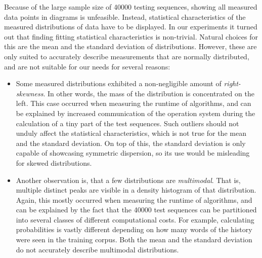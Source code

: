 Because of the large sample size of \num{40000} testing sequences, showing
all measured data points in diagrams is unfeasible.
Instead, statistical characteristics of the measured distributions of data
have to be displayed.
In our experiments it turned out that finding fitting statistical
characteristics is non-trivial.
Natural choices for this are the mean and the standard deviation of
distributions.
However, these are only suited to accurately describe measurements that are
normally distributed, and are not suitable for our needs for several reasons:
\begin{itemize}
  \item Some measured distributions exhibited a non-negligible amount of
    \emph{right-skewness}.
    In other words, the mass of the distribution is concentrated on the left.
    This case occurred when measuring the runtime of algorithms, and can be
    explained by increased communication of the operation system during the
    calculation of a tiny part of the test sequences.
    Such outliers should not unduly affect the statistical characteristics,
    which is not true for the mean and the standard deviation.
    On top of this, the standard deviation is only capable of showcasing
    symmetric dispersion, so its use would be misleading for skewed
    distributions.
  \item Another observation is, that a few distributions are \emph{multimodal}.
    That is, multiple distinct peaks are visible in a density histogram of that
    distribution.
    Again, this mostly occurred when measuring the runtime of algorithms,
    and can be explained by the fact that the \num{40000} test sequences can
    be partitioned into several classes of different computational costs.
    For example, calculating probabilities is vastly different depending on
    how many words of the history were seen in the training corpus.
    Both the mean and the standard deviation do not accurately describe
    multimodal distributions.
\end{itemize}

